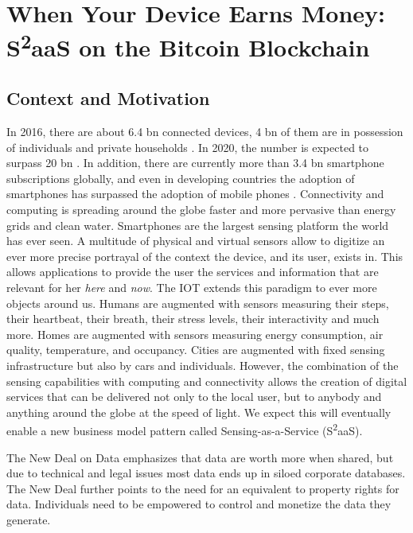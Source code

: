 \chapter{When Your Device Earns Money: S\textsuperscript{2}aaS on the Bitcoin Blockchain}
\label{sec:s2aas}


\section{Context and Motivation}

In 2016, there are about 6.4 bn connected devices, 4 bn of them are in possession of individuals and private households \parencite{Gartner2015}. In 2020, the number is expected to surpass 20 bn \parencite{Gartner2015}. In addition, there are currently more than 3.4 bn smartphone subscriptions globally, and even in developing countries the adoption of smartphones has surpassed the adoption of mobile phones \parencite{Ericsson2016}. Connectivity and computing is spreading around the globe faster and more pervasive than energy grids and clean water. Smartphones are the largest sensing platform the world has ever seen. A multitude of physical and virtual sensors allow to digitize an ever more precise portrayal of the context the device, and its user, exists in. This allows applications to provide the user the services and information that are relevant for her \emph{here} and \emph{now}. The \ac{IOT} extends this paradigm to ever more objects around us. Humans are augmented with sensors measuring their steps, their heartbeat, their breath, their stress levels, their interactivity and much more. Homes are augmented with sensors measuring energy consumption, air quality, temperature, and occupancy. Cities are augmented with fixed sensing infrastructure but also by cars and individuals.
However, the combination of the sensing capabilities with computing and connectivity allows the creation of digital services that can be delivered not only to the local user, but to anybody and anything around the globe at the speed of light. We expect this will eventually enable a new business model pattern called Sensing-as-a-Service (S\textsuperscript{2}aaS). 

The New Deal on Data \parencite{pentland2009reality} emphasizes that data are worth more when shared, but due to technical and legal issues most data ends up in siloed corporate databases. The New Deal further points to the need for an equivalent to property rights for data. Individuals need to be empowered to control and monetize the data they generate. 

